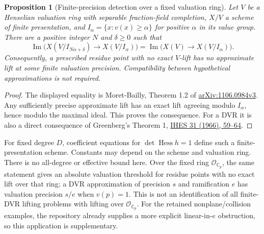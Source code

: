 \documentclass[11pt]{article}
\newtheorem{proposition}{Proposition}
\begin{document}
\begin{proposition}[Finite-precision detection over a fixed valuation ring]
Let $V$ be a Henselian valuation ring with separable fraction-field
completion, $X/V$ a scheme of finite presentation, and
$I_\alpha=\{x:v(x)\geq\alpha\}$ for positive $\alpha$ in its value group.
There are a positive integer $N$ and $\delta\geq0$ such that
\[
\operatorname{Im}\bigl(X(V/I_{N\alpha+\delta})\to X(V/I_\alpha)\bigr)
=\operatorname{Im}\bigl(X(V)\to X(V/I_\alpha)\bigr).
\]
Consequently, a prescribed residue point with no exact $V$-lift has no
approximate lift at some finite valuation precision. Compatibility between
hypothetical approximations is not required.
\end{proposition}
\begin{proof}
The displayed equality is Moret-Bailly, Theorem 1.2 of
\href{https://arxiv.org/abs/1106.0984v3}{arXiv:1106.0984v3}.
Any sufficiently precise approximate lift has an exact lift agreeing modulo
$I_\alpha$, hence modulo the maximal ideal. This proves the consequence.
For a DVR it is also a direct consequence of Greenberg's Theorem 1,
\href{https://numdam.org/articles/10.1007/BF02684802/}{IHES 31 (1966), 59--64}.
\end{proof}
For fixed degree $D$, coefficient equations for $\det\operatorname{Hess}h=1$
define such a finite-presentation scheme. Constants may depend on the scheme
and valuation ring. There is no all-degree or effective bound here. Over the
fixed ring $\mathcal O_{\mathbb C_p}$, the same statement gives an absolute
valuation threshold for residue points with no exact lift over that ring;
a DVR approximation of precision $s$ and ramification $e$ has valuation
precision $s/e$ when $v(p)=1$. This is not an identification of all finite-DVR
lifting problems with lifting over $\mathcal O_{\mathbb C_p}$. For the retained
nonplane/collision examples, the repository already supplies a more explicit
linear-in-$e$ obstruction, so this application is supplementary.
\end{document}
